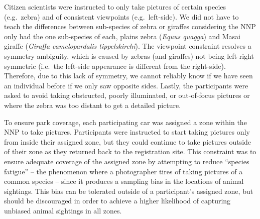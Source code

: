 Citizen scientists were instructed to only take pictures of certain species (e.g.\  zebra) and of consistent viewpoints (e.g.\ left-side).  We did not have to teach the differences between sub-species of zebra or giraffes considering the NNP only had the one sub-species of each, plains zebra (\textit{Equus quagga}) and Masai giraffe (\textit{Giraffa camelopardalis tippelskirchi}).  The viewpoint constraint resolves a symmetry ambiguity, which is caused by zebras (and giraffes) not being left-right symmetric (i.e.\ the left-side appearance is different from the right-side).  Therefore, due to this lack of symmetry, we cannot reliably know if we have seen an individual before if we only saw opposite sides.  Lastly, the participants were asked to avoid taking obstructed, poorly illuminated, or out-of-focus pictures or where the zebra was too distant to get a detailed picture.

To ensure park coverage, each participating car was assigned a zone within the NNP to take pictures.  Participants were instructed to start taking pictures only from inside their assigned zone, but they could continue to take pictures outside of their zone as they returned back to the registration site.  This constraint was to ensure adequate coverage of the assigned zone by attempting to reduce ``species fatigue'' -- the phenomenon where a photographer tires of taking pictures of a common species -- since it produces a sampling bias in the locations of animal sightings.  This bias can be tolerated outside of a participant's assigned zone, but should be discouraged in order to achieve a higher likelihood of capturing unbiased animal sightings in all zones.

